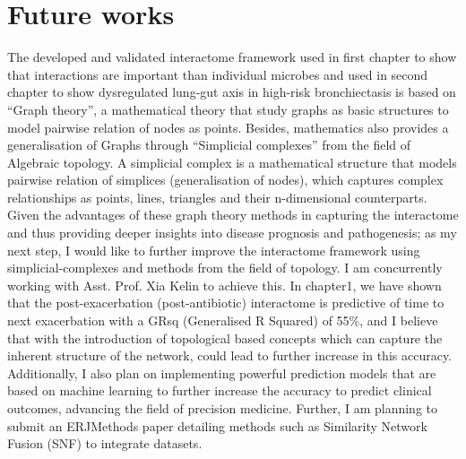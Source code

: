 \chapter*{Future works}

The developed and validated interactome framework used in first chapter to show that interactions are important than individual microbes and used in second chapter to show dysregulated lung-gut axis in high-risk bronchiectasis is based on “Graph theory”, a mathematical theory that study graphs as basic structures to model pairwise relation of nodes as points. Besides, mathematics also provides a generalisation of Graphs through “Simplicial complexes” from the field of Algebraic topology. A simplicial complex is a mathematical structure that models pairwise relation of simplices (generalisation of nodes), which captures complex relationships as points, lines, triangles and their n-dimensional counterparts. Given the advantages of these graph theory methods in capturing the interactome and thus providing deeper insights into disease prognosis and pathogenesis; as my next step, I would like to further improve the interactome framework using simplicial-complexes and methods from the field of topology. I am concurrently working with Asst. Prof. Xia Kelin to achieve this. In chapter1, we have shown that the post-exacerbation (post-antibiotic) interactome is predictive of time to next exacerbation with a GRsq (Generalised R Squared) of 55\%,
and I believe that with the introduction of topological based concepts which can capture the inherent structure of the network, could lead to further increase in this accuracy. Additionally, I also plan on implementing powerful prediction models that are based on machine learning to further increase the accuracy to predict clinical outcomes, advancing the field of precision medicine. Further, I am planning to submit an ERJMethods paper detailing methods such as Similarity Network Fusion (SNF) to integrate datasets.